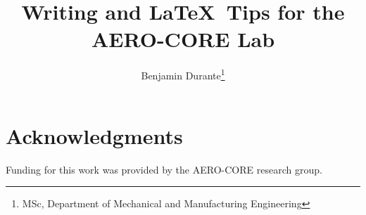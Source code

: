\documentclass[journal]{new-aiaa} %
\title{Writing and \LaTeX\ Tips for the AERO-CORE Lab} %
\author{
	Benjamin Durante\footnote{MSc, Department of Mechanical and Manufacturing Engineering}
}
\affil{University of Calgary, Calgary, Alberta, Canada, T2N 4V8}
\begin{document}

	\maketitle
	
	\tableofcontents
	
	
	


	\section*{Acknowledgments}
	Funding for this work was provided by the AERO-CORE research group. 

	
\end{document}
